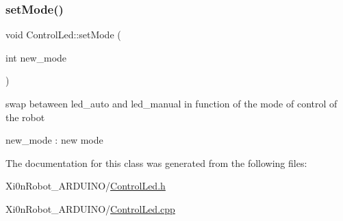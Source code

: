\subsubsection{\texorpdfstring{set\+Mode()}{setMode()}}
{\footnotesize\ttfamily void Control\+Led\+::set\+Mode (\begin{DoxyParamCaption}\item[{int}]{new\+\_\+mode }\end{DoxyParamCaption})}



swap betaween led\+\_\+auto and led\+\_\+manual in function of the mode of control of the robot 

new\+\_\+mode \+: new mode 

The documentation for this class was generated from the following files\+:\begin{DoxyCompactItemize}
\item 
Xi0n\+Robot\+\_\+\+A\+R\+D\+U\+I\+N\+O/\hyperlink{_control_led_8h}{Control\+Led.\+h}\item 
Xi0n\+Robot\+\_\+\+A\+R\+D\+U\+I\+N\+O/\hyperlink{_control_led_8cpp}{Control\+Led.\+cpp}\end{DoxyCompactItemize}
